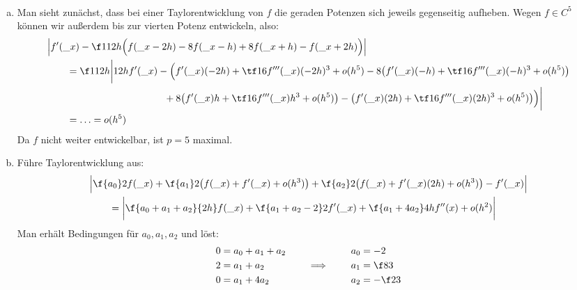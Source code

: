 \documentclass[a4paper]{scrartcl}
\begin{document}
\begin{aufgabe}~

	\begin{enumerate}[(a)]
		\item
			Man sieht zunächst, dass bei einer Taylorentwicklung von $f$ die geraden Potenzen sich jeweils gegenseitig aufheben.
			Wegen $f\in C^5$ können wir außerdem bis zur vierten Potenz entwickeln, also:
			\begin{align*}
				&\Big| f'(\_x) - \f 1{12h}\Big(f(\_x-2h) - 8f(\_x-h) + 8f(\_x+h) - f(\_x+2h)\Big)\Big| \\
				&\qquad= \f 1{12h} \bigg| 12h f'(\_x) - \Big(f'(\_x)(-2h) + \tf 16 f'''(\_x)(-2h)^3 + o(h^5) - 8\big(f'(\_x)(-h) + \tf 16 f'''(\_x)(-h)^3 + o(h^5)\big) \\
				&\qquad\qquad\qquad\qquad\qquad\qquad + 8\big(f'(\_x)h + \tf 16f'''(\_x)h^3 + o(h^5)\big) - \big(f'(\_x)(2h) + \tf 16 f'''(\_x)(2h)^3 + o(h^5)\big) \Big) \bigg| \\
				&\qquad = \dotsc = o(h^5)
			\end{align*}
			Da $f$ nicht weiter entwickelbar, ist $p=5$ maximal.
		\item
			Führe Taylorentwicklung aus:
			\begin{align*}
				&\Big| \f {a_0}2 f(\_x) + \f{a_1}2\big(f(\_x) + f'(\_x) + o(h^3)\big) + \f{a_2}2\big(f(\_x) + f'(\_x)(2h) + o(h^3)\big) - f'(\_x) \Big| \\
				&\qquad= \bigg| \f {a_0 + a_1 + a_2}{2h}f(\_x) + \f{a_1 + a_2 - 2}2 f'(\_x) + \f {a_1 + 4a_2}4 h f''(x) + o(h^2) \bigg|
			\end{align*}
			Man erhält Bedingungen für $a_0,a_1,a_2$ und löst:
			\begin{align*}
				\begin{aligned}
					0 &= a_0 + a_1 + a_2 \\
					2 &= a_1 + a_2 \\
					0 &= a_1 + 4a_2
				\end{aligned}
				\qquad\implies\qquad
				\begin{aligned}
					a_0 &= -2 \\
					a_1 &= \f 83 \\
					a_2 &= -\f 23
				\end{aligned}
			\end{align*}
	\end{enumerate}
\end{aufgabe}
\end{document}
